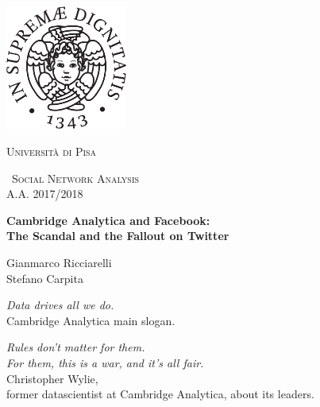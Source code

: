 \begin{titlepage}
    \centering
    \includegraphics[width=0.30\textwidth]{images/cherubino_black.pdf}\par\vspace{1cm}
    {\scshape\LARGE Università di Pisa \par}
    \vspace{1cm}
    {\scshape\ Social Network Analysis \\A.A. 2017/2018\par}
    \vspace{1.5cm}
    {\huge\bfseries Cambridge Analytica and Facebook: \\ The Scandal and the Fallout on Twitter\\ \par}
    \vspace{2cm}
    {\Large Gianmarco Ricciarelli \\ Stefano Carpita \par}
    \vfill

\begin{flushright}    
  \textit{Data drives all we do.}\\
\vspace{2 mm}
Cambridge Analytica main slogan.
\end{flushright}

\vspace{4 mm}
    
\begin{flushright}    
  \textit{Rules don’t matter for them. \\ For them, this is a war, and it’s all fair.}\\
\vspace{2 mm}
  Christopher Wylie, \\ former datascientist at Cambridge Analytica, about its leaders.
\end{flushright}




  \end{titlepage}

